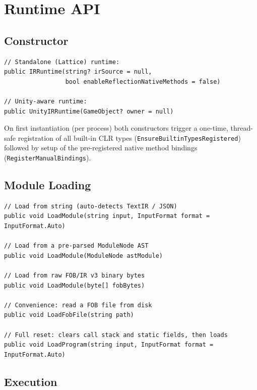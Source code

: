 \documentclass[11pt,a4paper]{article}
\newcommand{\code}[1]{\texttt{\small #1}}
\begin{document}
\section{Runtime API}
\label{sec:api}

\subsection{Constructor}

\begin{lstlisting}[style=cs]
// Standalone (Lattice) runtime:
public IRRuntime(string? irSource = null,
                 bool enableReflectionNativeMethods = false)

// Unity-aware runtime:
public UnityIRRuntime(GameObject? owner = null)
\end{lstlisting}

On first instantiation (per process) both constructors trigger a one-time,
thread-safe registration of all built-in CLR types
(\code{EnsureBuiltinTypesRegistered}) followed by setup of the pre-registered
native method bindings (\code{RegisterManualBindings}).

\subsection{Module Loading}

\begin{lstlisting}[style=cs]
// Load from string (auto-detects TextIR / JSON)
public void LoadModule(string input, InputFormat format = InputFormat.Auto)

// Load from a pre-parsed ModuleNode AST
public void LoadModule(ModuleNode astModule)

// Load from raw FOB/IR v3 binary bytes
public void LoadModule(byte[] fobBytes)

// Convenience: read a FOB file from disk
public void LoadFobFile(string path)

// Full reset: clears call stack and static fields, then loads
public void LoadProgram(string input, InputFormat format = InputFormat.Auto)
\end{lstlisting}

\subsection{Execution}
\end{document}
